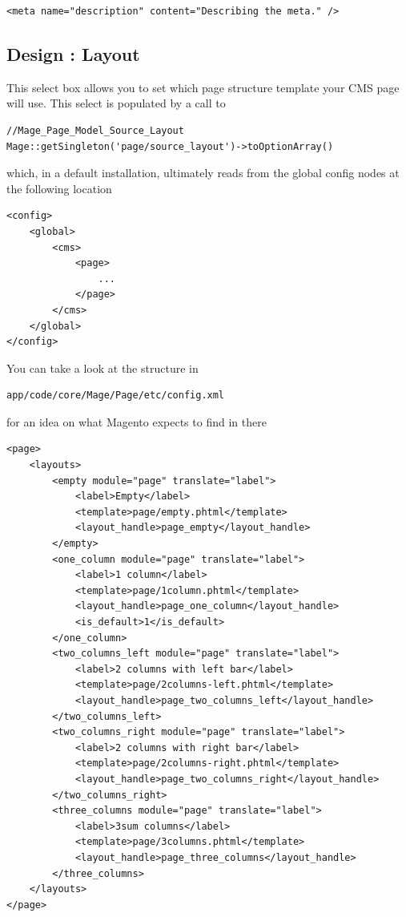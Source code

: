 \documentclass[oneside]{book}
\begin{document}
\begin{lstlisting}
<meta name="description" content="Describing the meta." /> 

\end{lstlisting}


\subsection{Design : Layout}

This select box allows you to set which page structure template your CMS page will use. This select is populated by a call to

\begin{lstlisting}
//Mage_Page_Model_Source_Layout
Mage::getSingleton('page/source_layout')->toOptionArray()

\end{lstlisting}


which, in a default installation, ultimately reads from the global config nodes at the following location

\begin{lstlisting}
<config>
    <global>
        <cms>
            <page>
                ...
            </page>
        </cms>
    </global>
</config>

\end{lstlisting}


You can take a look at the structure in 

\begin{lstlisting}
app/code/core/Mage/Page/etc/config.xml

\end{lstlisting}


for an idea on what Magento expects to find in there    

\begin{lstlisting}
<page>
    <layouts>
        <empty module="page" translate="label">
            <label>Empty</label>
            <template>page/empty.phtml</template>
            <layout_handle>page_empty</layout_handle>
        </empty>
        <one_column module="page" translate="label">
            <label>1 column</label>
            <template>page/1column.phtml</template>
            <layout_handle>page_one_column</layout_handle>
            <is_default>1</is_default>
        </one_column>
        <two_columns_left module="page" translate="label">
            <label>2 columns with left bar</label>
            <template>page/2columns-left.phtml</template>
            <layout_handle>page_two_columns_left</layout_handle>
        </two_columns_left>
        <two_columns_right module="page" translate="label">
            <label>2 columns with right bar</label>
            <template>page/2columns-right.phtml</template>
            <layout_handle>page_two_columns_right</layout_handle>
        </two_columns_right>
        <three_columns module="page" translate="label">
            <label>3sum columns</label>
            <template>page/3columns.phtml</template>
            <layout_handle>page_three_columns</layout_handle>
        </three_columns>
    </layouts>
</page>

\end{lstlisting}
\end{document}
